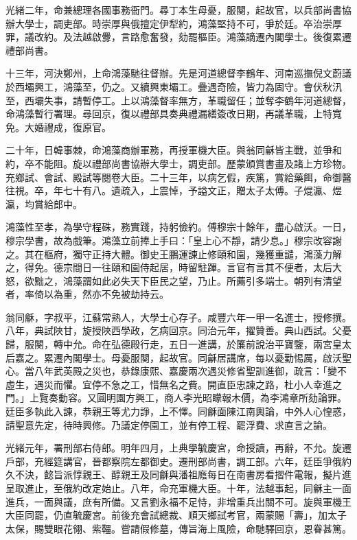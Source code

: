 \begin{pinyinscope}
光緒二年，命兼總理各國事務衙門。尋丁本生母憂，服闋，起故官，以兵部尚書協辦大學士，調吏部。時崇厚與俄擅定伊犁約，鴻藻堅持不可，爭於廷。卒治崇厚罪，議改約。及法越啟釁，言路愈奮發，劾罷樞臣。鴻藻謫遷內閣學士。後復累遷禮部尚書。

十三年，河決鄭州，上命鴻藻馳往督辦。先是河道總督李鶴年、河南巡撫倪文蔚議於西壩興工，鴻藻至，仍之。又續興東壩工。疊遇奇險，皆力為固守。會伏秋汛至，西壩失事，請暫停工。上以鴻藻督率無方，革職留任；並奪李鶴年河道總督，命鴻藻暫行署理。尋回京，復以禮部具奏典禮漏繕簽改日期，再議革職，上特寬免。大婚禮成，復原官。

二十年，日韓事棘，命鴻藻商辦軍務，再授軍機大臣。與翁同龢皆主戰，並爭和約，卒不能阻。旋以禮部尚書協辦大學士，調吏部。歷蒙頒賞書畫及諸上方珍物。充鄉試、會試、殿試等閱卷大臣。二十三年，以病乞假，疾篤，賞給藥餌，命御醫往視。卒，年七十有八。遺疏入，上震悼，予謚文正，贈太子太傅。子焜瀛、煜瀛，均賞給郎中。

鴻藻性至孝，為學守程硃，務實踐，持躬儉約。傅穆宗十餘年，盡心啟沃。一日，穆宗學書，故為戲筆。鴻藻立前捧上手曰：「皇上心不靜，請少息。」穆宗改容謝之。其在樞府，獨守正持大體。御史王鵬運諫止修頤和園，幾獲重譴，鴻藻力解之，得免。德宗間日一往頤和園侍起居，時留駐蹕。言官有言其不便者，太后大怒，欲黜之，鴻藻謂如此必失天下臣民之望，乃止。所薦引多端士。朝列有清望者，率倚以為重，然亦不免被劫持云。

翁同龢，字叔平，江蘇常熟人，大學士心存子。咸豐六年一甲一名進士，授修撰。八年，典試陜甘，旋授陜西學政，乞病回京。同治元年，擢贊善。典山西試。父憂歸，服闋，轉中允。命在弘德殿行走，五日一進講，於簾前說治平寶鑒，兩宮皇太后嘉之。累遷內閣學士。母憂服闋，起故官。同龢居講席，每以憂勤惕厲，啟沃聖心。當八年武英殿之災也，恭錄康熙、嘉慶兩次遇災修省聖訓進御，疏言：「變不虛生，遇災而懼。宜停不急之工，惜無名之費。開直臣忠諫之路，杜小人幸進之門。」上覽奏動容。又圓明園方興工，商人李光昭矇報木價，為李鴻章所劾論罪。廷臣多執此入諫，恭親王等尤力諍，上不懌。同龢面陳江南輿論，中外人心惶惑，請聖意先定，待時興修。乃議定停園工，並有停工程、罷浮費、求直言之諭。

光緒元年，署刑部右侍郎。明年四月，上典學毓慶宮，命授讀，再辭，不允。旋遷戶部，充經筵講官，晉都察院左都御史。遷刑部尚書，調工部。六年，廷臣爭俄約久不決，懿旨派惇親王、醇親王及同龢與潘祖廕每日在南書房看摺件電報，擬片進呈取進止，至俄約改定始止。八年，命充軍機大臣。十年，法越事起，同龢主一面進兵，一面與議，庶有所備。又言劉永福不足恃，非增重兵出關不可。旋與軍機王大臣同罷，仍直毓慶宮。前後充會試總裁、順天鄉試考官，兩蒙賜「壽」，加太子太保，賜雙眼花翎、紫韁。嘗請假修墓，傳旨海上風險，命馳驛回京，恩眷甚篤。


\end{pinyinscope}
